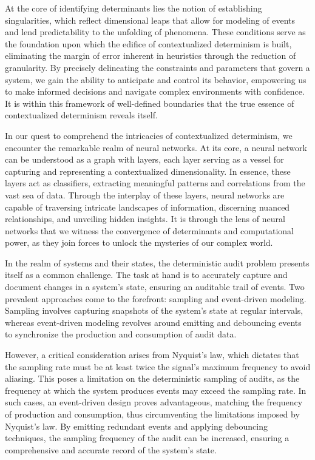 \documentclass[ebook,12pt,oneside,openany]{memoir}
\begin{document}
\indent At the core of identifying determinants lies the notion of establishing singularities, which reflect dimensional leaps that allow for modeling of events and lend predictability to the unfolding of phenomena. These conditions serve as the foundation upon which the edifice of contextualized determinism is built, eliminating the margin of error inherent in heuristics through the reduction of granularity. By precisely delineating the constraints and parameters that govern a system, we gain the ability to anticipate and control its behavior, empowering us to make informed decisions and navigate complex environments with confidence. It is within this framework of well-defined boundaries that the true essence of contextualized determinism reveals itself.

\indent In our quest to comprehend the intricacies of contextualized determinism, we encounter the remarkable realm of neural networks. At its core, a neural network can be understood as a graph with layers, each layer serving as a vessel for capturing and representing a contextualized dimensionality. In essence, these layers act as classifiers, extracting meaningful patterns and correlations from the vast sea of data. Through the interplay of these layers, neural networks are capable of traversing intricate landscapes of information, discerning nuanced relationships, and unveiling hidden insights. It is through the lens of neural networks that we witness the convergence of determinants and computational power, as they join forces to unlock the mysteries of our complex world.

\indent In the realm of systems and their states, the deterministic audit problem presents itself as a common challenge. The task at hand is to accurately capture and document changes in a system's state, ensuring an auditable trail of events. Two prevalent approaches come to the forefront: sampling and event-driven modeling. Sampling involves capturing snapshots of the system's state at regular intervals, whereas event-driven modeling revolves around emitting and debouncing events to synchronize the production and consumption of audit data.

\indent However, a critical consideration arises from Nyquist's law, which dictates that the sampling rate must be at least twice the signal's maximum frequency to avoid aliasing. This poses a limitation on the deterministic sampling of audits, as the frequency at which the system produces events may exceed the sampling rate. In such cases, an event-driven design proves advantageous, matching the frequency of production and consumption, thus circumventing the limitations imposed by Nyquist's law. By emitting redundant events and applying debouncing techniques, the sampling frequency of the audit can be increased, ensuring a comprehensive and accurate record of the system's state.
\end{document}
